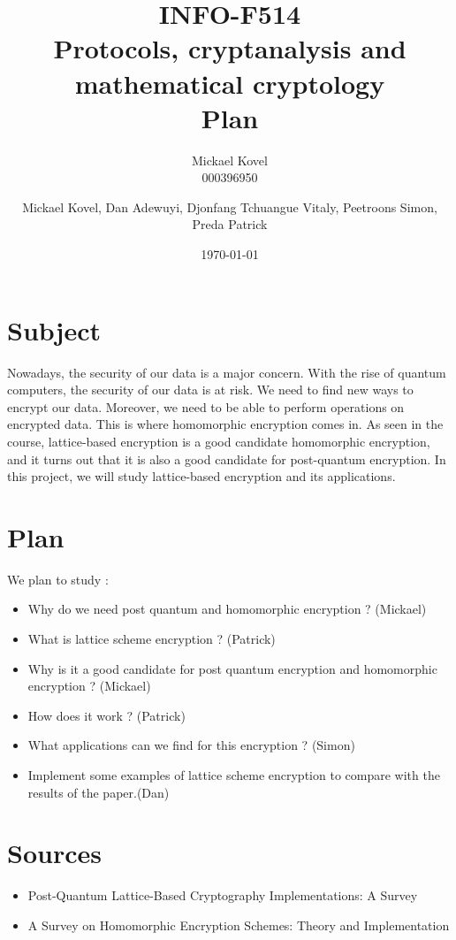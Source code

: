\documentclass{article}
\begin{document}
\begin{figure}[t]
	\label{fig:ulbLogo}
\end{figure}
\author {Mickael Kovel\\000396950}
\date{\today}
\title{INFO-F514 \\ Protocols, cryptanalysis and mathematical cryptology \\ Plan}
\author{Mickael Kovel, Dan Adewuyi, Djonfang Tchuangue Vitaly, Peetroons Simon, Preda Patrick}
\maketitle
\newpage


\section{\label{sec:subj}Subject}
Nowadays, the security of our data is a major concern. With the rise of quantum computers,
the security of our data is at risk. We need to find new ways to encrypt our data.
Moreover, we need to be able to perform operations on encrypted data. This is where
homomorphic encryption comes in.
As seen in the course, lattice-based encryption is a good candidate homomorphic encryption,
and it turns out that it is also a good candidate for post-quantum encryption.
In this project, we will study lattice-based encryption and its applications.

\section{\label{sec:Plan}Plan}
We plan to study : 
\begin{itemize}
    \item Why do we need post quantum and homomorphic encryption ? (Mickael)
    \item What is lattice scheme encryption ? (Patrick)
    \item Why is it a good candidate for post quantum encryption and homomorphic encryption ? (Mickael)
    \item How does it work ? (Patrick)
    \item What applications can we find for this encryption ? (Simon)
      \item Implement some examples of lattice scheme encryption to compare with the 
        results of the paper.(Dan)
\end{itemize}

\section{Sources}

\begin{itemize}
    \item Post-Quantum Lattice-Based Cryptography Implementations: A Survey\cite{10.1145/3292548}
    \item A Survey on Homomorphic Encryption Schemes: Theory and Implementation\cite{10.1145/3214303}
\end{itemize}



\end{document}
